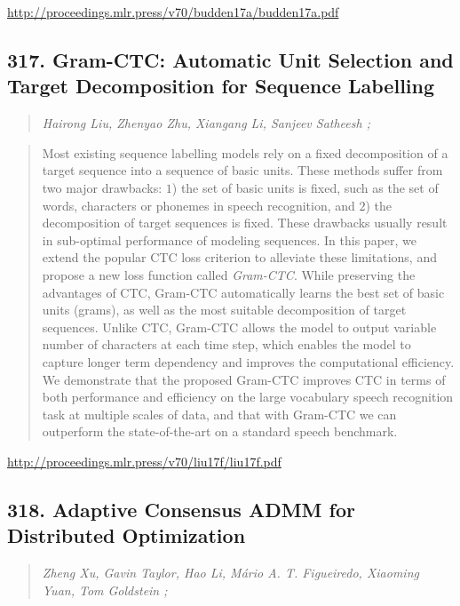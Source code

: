 \documentclass{article}
\begin{document}
\href{http://proceedings.mlr.press/v70/budden17a/budden17a.pdf}{http://proceedings.mlr.press/v70/budden17a/budden17a.pdf}

\subsection{317. Gram-CTC: Automatic Unit Selection and Target Decomposition for Sequence Labelling}

\begin{quote}
\footnotesize{\textit{Hairong Liu, Zhenyao Zhu, Xiangang Li, Sanjeev Satheesh ;}}
\end{quote}

\begin{quote}
    Most existing sequence labelling models rely on a fixed decomposition of a target sequence into a sequence of basic units. These methods suffer from two major drawbacks: $1$) the set of basic units is fixed, such as the set of words, characters or phonemes in speech recognition, and $2$) the decomposition of target sequences is fixed. These drawbacks usually result in sub-optimal performance of modeling sequences. In this paper, we extend the popular CTC loss criterion to alleviate these limitations, and propose a new loss function called \textit{Gram-CTC}. While preserving the advantages of CTC, Gram-CTC automatically learns the best set of basic units (grams), as well as the most suitable decomposition of target sequences. Unlike CTC, Gram-CTC allows the model to output variable number of characters at each time step, which enables the model to capture longer term dependency and improves the computational efficiency. We demonstrate that the proposed Gram-CTC improves CTC in terms of both performance and efficiency on the large vocabulary speech recognition task at multiple scales of data, and that with Gram-CTC we can outperform the state-of-the-art on a standard speech benchmark.  \end{quote}

\href{http://proceedings.mlr.press/v70/liu17f/liu17f.pdf}{http://proceedings.mlr.press/v70/liu17f/liu17f.pdf}

\subsection{318. Adaptive Consensus ADMM for Distributed Optimization}

\begin{quote}
\footnotesize{\textit{Zheng Xu, Gavin Taylor, Hao Li, Mário A. T. Figueiredo, Xiaoming Yuan, Tom Goldstein ;}}
\end{quote}
\end{document}

